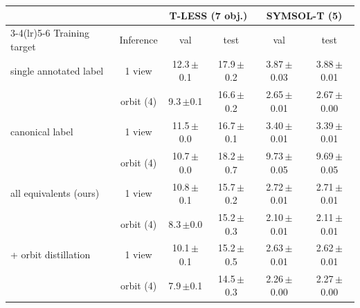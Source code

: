 \begin{tabular}{@{}l c cc cc@{}}
\toprule
 & & \multicolumn{2}{c}{T-LESS (7 obj.)} & \multicolumn{2}{c}{SYMSOL-T (5)} \\
\cmidrule(lr){3-4}\cmidrule(lr){5-6} Training target & Inference & val & test & val & test \\
\midrule
single annotated label & 1 view & 12.3\,{\scriptsize$\pm$0.1} & 17.9\,{\scriptsize$\pm$0.2} & 3.87\,{\scriptsize$\pm$0.03} & 3.88\,{\scriptsize$\pm$0.01} \\
 & orbit (4) & 9.3\,{\scriptsize$\pm$0.1} & 16.6\,{\scriptsize$\pm$0.2} & 2.65\,{\scriptsize$\pm$0.01} & 2.67\,{\scriptsize$\pm$0.00} \\
\addlinespace[2pt]
canonical label & 1 view & 11.5\,{\scriptsize$\pm$0.0} & 16.7\,{\scriptsize$\pm$0.1} & 3.40\,{\scriptsize$\pm$0.01} & 3.39\,{\scriptsize$\pm$0.01} \\
 & orbit (4) & 10.7\,{\scriptsize$\pm$0.0} & 18.2\,{\scriptsize$\pm$0.7} & 9.73\,{\scriptsize$\pm$0.05} & 9.69\,{\scriptsize$\pm$0.05} \\
\addlinespace[2pt]
all equivalents (ours) & 1 view & 10.8\,{\scriptsize$\pm$0.1} & 15.7\,{\scriptsize$\pm$0.2} & 2.72\,{\scriptsize$\pm$0.01} & 2.71\,{\scriptsize$\pm$0.01} \\
 & orbit (4) & 8.3\,{\scriptsize$\pm$0.0} & 15.2\,{\scriptsize$\pm$0.3} & 2.10\,{\scriptsize$\pm$0.01} & 2.11\,{\scriptsize$\pm$0.01} \\
\addlinespace[2pt]
\;+ orbit distillation & 1 view & 10.1\,{\scriptsize$\pm$0.1} & 15.2\,{\scriptsize$\pm$0.5} & 2.63\,{\scriptsize$\pm$0.01} & 2.62\,{\scriptsize$\pm$0.01} \\
 & orbit (4) & 7.9\,{\scriptsize$\pm$0.1} & 14.5\,{\scriptsize$\pm$0.3} & 2.26\,{\scriptsize$\pm$0.00} & 2.27\,{\scriptsize$\pm$0.00} \\
\bottomrule
\end{tabular}